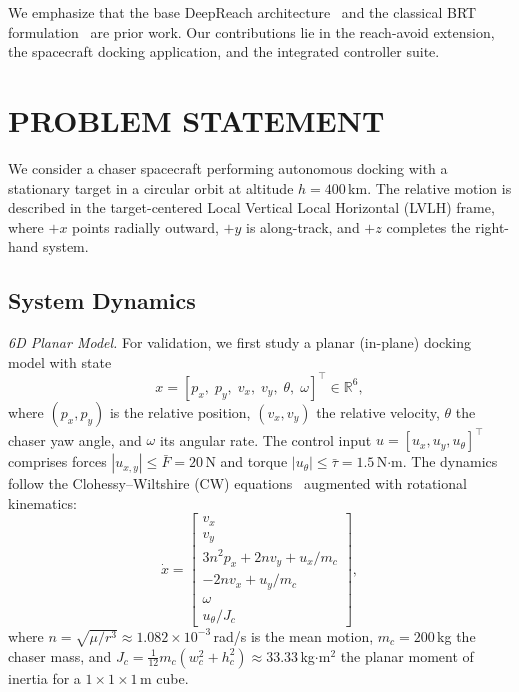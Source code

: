 \documentclass[letterpaper, 10 pt, conference]{ieeeconf}
\begin{document}
We emphasize that the base DeepReach architecture~\cite{bansal2021deepreach} and the classical BRT formulation~\cite{mitchell2005} are prior work. Our contributions lie in the reach-avoid extension, the spacecraft docking application, and the integrated controller suite.

\section{PROBLEM STATEMENT}

We consider a chaser spacecraft performing autonomous docking with a stationary target in a circular orbit at altitude $h = 400$\,km. The relative motion is described in the target-centered Local Vertical Local Horizontal (LVLH) frame, where $+x$ points radially outward, $+y$ is along-track, and $+z$ completes the right-hand system.

\subsection{System Dynamics}

\textit{6D Planar Model.}
For validation, we first study a planar (in-plane) docking model with state
\begin{equation}\label{eq:state6d}
x = [p_x,\; p_y,\; v_x,\; v_y,\; \theta,\; \omega]^\top \in \mathbb{R}^6,
\end{equation}
where $(p_x, p_y)$ is the relative position, $(v_x, v_y)$ the relative velocity, $\theta$ the chaser yaw angle, and $\omega$ its angular rate. The control input $u = [u_x, u_y, u_\theta]^\top$ comprises forces $|u_{x,y}| \leq \bar{F} = 20$\,N and torque $|u_\theta| \leq \bar{\tau} = 1.5$\,N$\cdot$m. The dynamics follow the Clohessy--Wiltshire (CW) equations~\cite{clohessy1960} augmented with rotational kinematics:
\begin{equation}\label{eq:cw6d}
\dot{x} = \begin{bmatrix} v_x \\ v_y \\ 3n^2 p_x + 2nv_y + u_x/m_c \\ -2nv_x + u_y/m_c \\ \omega \\ u_\theta / J_c \end{bmatrix},
\end{equation}
where $n = \sqrt{\mu/r^3} \approx 1.082 \times 10^{-3}$\,rad/s is the mean motion, $m_c = 200$\,kg the chaser mass, and $J_c = \tfrac{1}{12}m_c(w_c^2 + h_c^2) \approx 33.33$\,kg$\cdot$m$^2$ the planar moment of inertia for a $1\times1\times1$\,m cube.
\end{document}
